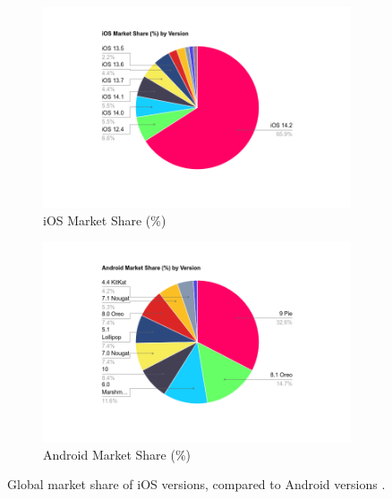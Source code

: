\begin{figure}[htbp]
    \centering
    \begin{subfigure}{.5\textwidth}
        \centering
        \includegraphics[width=\textwidth]{./figures/ch2_ios-market-share.png}
        \caption{iOS Market Share (\%)}
        \label{fig:sub1}
    \end{subfigure}%
    \begin{subfigure}{.5\textwidth}
        \centering
        \includegraphics[width=\textwidth]{./figures/ch2_android-market-share.png}
        \caption{Android Market Share (\%)}
        \label{fig:sub2}
    \end{subfigure}
    \caption{Global market share of iOS versions, compared to Android versions \cite{StatCounterIOSVersionsMarketShare} \cite{XDADevsAndroidVersionsMarketShare}.}
    \label{FigAndroidVsIosFragmentation}
\end{figure}

